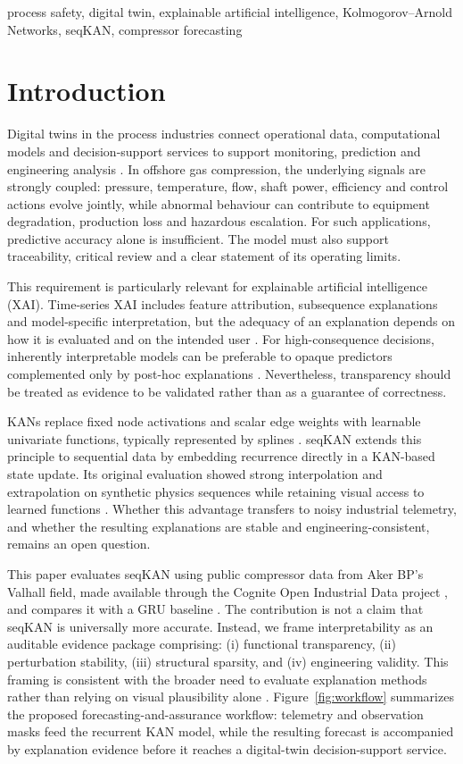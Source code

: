 \documentclass[conference]{IEEEtran}
\begin{document}
\begin{IEEEkeywords}
process safety, digital twin, explainable artificial intelligence, Kolmogorov--Arnold Networks, seqKAN, compressor forecasting
\end{IEEEkeywords}

\section{Introduction}
Digital twins in the process industries connect operational data, computational models and decision-support services to support monitoring, prediction and engineering analysis \cite{perno2022,peterson2025}. In offshore gas compression, the underlying signals are strongly coupled: pressure, temperature, flow, shaft power, efficiency and control actions evolve jointly, while abnormal behaviour can contribute to equipment degradation, production loss and hazardous escalation. For such applications, predictive accuracy alone is insufficient. The model must also support traceability, critical review and a clear statement of its operating limits.

This requirement is particularly relevant for explainable artificial intelligence (XAI). Time-series XAI includes feature attribution, subsequence explanations and model-specific interpretation, but the adequacy of an explanation depends on how it is evaluated and on the intended user \cite{theissler2022}. For high-consequence decisions, inherently interpretable models can be preferable to opaque predictors complemented only by post-hoc explanations \cite{rudin2019}. Nevertheless, transparency should be treated as evidence to be validated rather than as a guarantee of correctness.

KANs replace fixed node activations and scalar edge weights with learnable univariate functions, typically represented by splines \cite{liu2024}. seqKAN extends this principle to sequential data by embedding recurrence directly in a KAN-based state update. Its original evaluation showed strong interpolation and extrapolation on synthetic physics sequences while retaining visual access to learned functions \cite{boura2025}. Whether this advantage transfers to noisy industrial telemetry, and whether the resulting explanations are stable and engineering-consistent, remains an open question.

This paper evaluates seqKAN using public compressor data from Aker BP's Valhall field, made available through the Cognite Open Industrial Data project \cite{cognite2018}, and compares it with a GRU baseline \cite{cho2014}. The contribution is not a claim that seqKAN is universally more accurate. Instead, we frame interpretability as an auditable evidence package comprising: (i) functional transparency, (ii) perturbation stability, (iii) structural sparsity, and (iv) engineering validity. This framing is consistent with the broader need to evaluate explanation methods rather than relying on visual plausibility alone \cite{adebayo2018}. Figure~\ref{fig:workflow} summarizes the proposed forecasting-and-assurance workflow: telemetry and observation masks feed the recurrent KAN model, while the resulting forecast is accompanied by explanation evidence before it reaches a digital-twin decision-support service.
\end{document}
